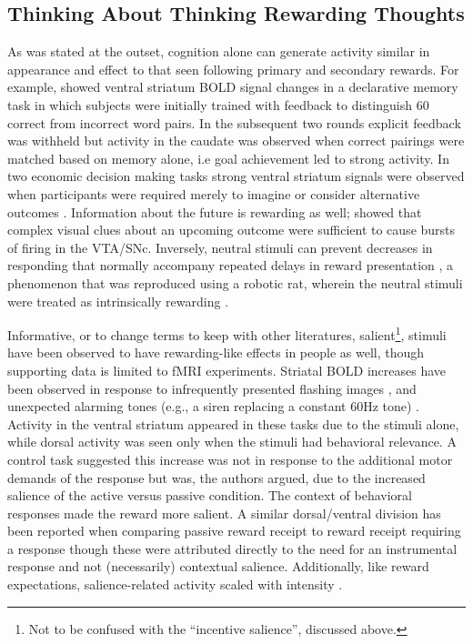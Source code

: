 \subsection{Thinking About Thinking Rewarding Thoughts}
\label{sub:cogrew}
As was stated at the outset, cognition alone can generate activity similar in appearance and effect to that seen following primary and secondary rewards.  For example,  showed ventral striatum BOLD signal changes in a declarative memory task in which subjects were initially trained with feedback to distinguish 60 correct from incorrect word pairs.  In the subsequent two rounds explicit feedback was withheld but activity in the caudate was observed when correct pairings were matched based on memory alone, i.e goal achievement led to strong activity.  In two economic decision making tasks strong ventral striatum signals were observed when participants were required merely to imagine or consider alternative outcomes  \cite{Hayden:2009p6545, Lohrenz:2007p7240}.  Information about the future is rewarding as well;  showed that complex visual clues about an upcoming outcome were sufficient to cause bursts of firing in the VTA/SNc.  Inversely, neutral stimuli can prevent decreases in responding that normally accompany repeated delays in reward presentation \cite{Reed:1992p9094}, a phenomenon that was reproduced using a robotic rat, wherein the neutral stimuli were treated as intrinsically rewarding \cite{Fiore:2008p7249}.

Informative, or to change terms to keep with other literatures, salient\footnote{
    Not to be confused with the ``incentive salience'', discussed above.
}, stimuli have been observed to have rewarding-like effects in people as well, though supporting data is limited to fMRI experiments.  Striatal BOLD increases have been observed in response to infrequently presented flashing images \cite{Zink:2003p5107}, and unexpected alarming tones (e.g., a siren replacing a constant 60Hz tone) \cite{Zink:2006p7210}.  Activity in the ventral striatum appeared in these tasks due to the stimuli alone, while dorsal activity was seen only when the stimuli had behavioral relevance.  A control task suggested this increase was not in response to the additional motor demands of the response but was, the authors argued, due to the increased salience of the active versus passive condition.  The context of behavioral responses made the reward more salient.  A similar dorsal/ventral division has been reported when comparing passive reward receipt to reward receipt requiring a response \cite{ODoherty:2006p2875} though these were attributed directly to the need for an instrumental response and not (necessarily) contextual salience.  Additionally, like reward expectations, salience-related activity scaled with intensity \cite{Zink:2006p7210}.

